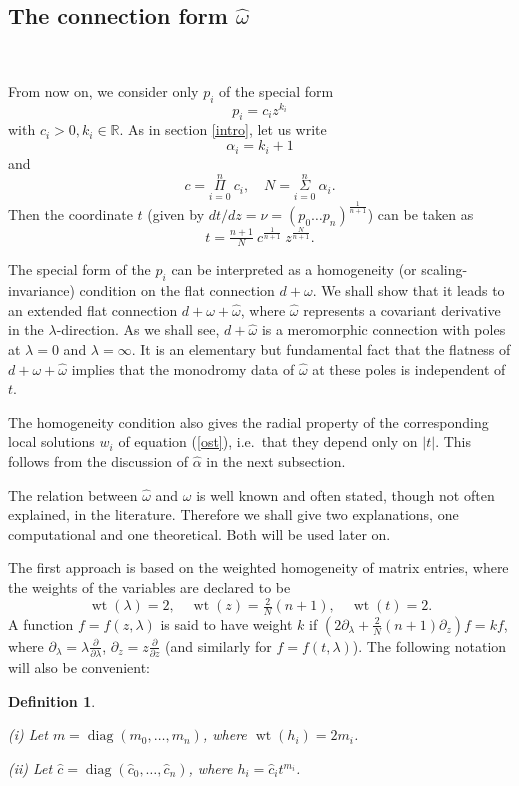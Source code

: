 \documentclass[a4paper,12pt,leqno]{amsart}
\numberwithin{equation}{section}
\theoremstyle{plain}
\newtheorem{definition}[theorem]{Definition}
\theoremstyle{definition}
\newcommand{\R}{\mathbb R}
\newcommand{\al}{\alpha}
\newcommand{\la}{\lambda}
\newcommand{\om}{\omega}
\DeclareMathOperator{\diag}{diag}
\DeclareMathOperator{\wt}{wt}
\newcommand{\no}{\noindent}
\renewcommand{\b}{\partial}
\newcommand{\bla}{\b_\la}
\newcommand{\bz}{\b_z}
\newcommand{\nn}{m}
\begin{document}
\subsection{The connection form $\hat\om$}\label{four3}  \ 

From now on, we consider only $p_i$ of the special form
\[
p_i=c_i z^{k_i}
\]
with $c_i>0,k_i\in\R$.    As in section \ref{intro}, let us write
\[
\al_i=k_i+1
\]
and
\[
c=
\overset{\scriptstyle n}{\underset{\scriptstyle i=0}\Pi}
 \ c_i,\quad
N=
 \overset{\scriptstyle n}{\underset{\scriptstyle i=0}\Sigma}
\ \al_i.
\]
Then the coordinate $t$ (given by
$dt/dz=\nu=(p_0\dots p_n)^{\frac1{n+1}}$)
can be taken as
\[
t=\tfrac{n+1}N \ c^{\frac1{n+1}} \ z^{\frac N{n+1}}.
\]

The special form of the $p_i$ can be interpreted as a homogeneity (or scaling-invariance) condition
on the flat connection $d+\om$.  We shall show that it leads to an extended flat connection
$d+\om+\hat\om$, where $\hat\om$ represents a covariant derivative in the $\la$-direction. As we shall see,  $d+\hat\om$ is a meromorphic connection with poles at $\la=0$ and $\la=\infty$.   It is an elementary but fundamental fact that the flatness of $d+\om+\hat\om$ implies that the monodromy data of $\hat\om$ at these poles is independent of $t$.  

The homogeneity condition also gives the radial property of the corresponding local solutions $w_i$ of equation (\ref{ost}), i.e.\  that they depend only on $\vert t\vert$.  This follows from the discussion of $\hat\al$ in the next subsection.

The relation between $\hat\om$ and $\om$ is well known and often stated, though not often explained, in the literature.  Therefore we shall give two explanations, one computational and one theoretical.  Both will be used later on.

The first approach is based on the weighted homogeneity of matrix entries, where the weights of the variables are declared to be
\[
\wt(\la) = 2,\quad \wt(z) = \tfrac2N(n+1),\quad \wt(t)=2.
\]
A function $f=f(z,\la)$ is said to have weight $k$ if $(2\bla+\frac2N(n+1)\bz)f=kf$,
where  $\bla=\la \frac{\b}{\b\la}$, $\bz=z \frac{\b}{\b z}$ (and similarly for $f=f(t,\la)$).  The following notation will also be convenient:

\begin{definition}\label{weightofhandchat}  $ $

\no(i) Let $\nn=\diag(\nn_0,\dots,\nn_n)$, where
$\wt(h_i)=2\nn_i$.

\no(ii) Let $\hat c=\diag(\hat c_0,\dots,\hat c_n)$, where
$h_i=\hat c_i t^{\nn_i}$.
\end{definition}
\end{document}
